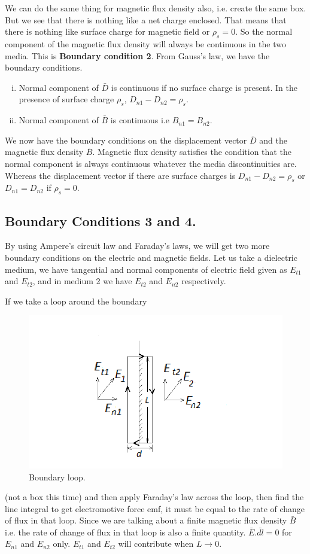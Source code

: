 We can do the same thing for magnetic flux density also, i.e. create the same box. But we see that there is nothing like a net charge enclosed. That means that there is nothing like surface charge for magnetic field or $\rho_s = 0$. So the normal component of the magnetic flux density will always be continuous in the two media. This is \textbf{Boundary condition 2}. From Gauss's law, we have the boundary conditions.
\begin{enumerate}[(i)]
\item Normal component of $\bar{D}$ is continuous if no surface charge is present. In the presence of surface charge $\rho_s$, $D_{n1}- D_{n2} = \rho_s$.
\item Normal component of $\bar{B}$ is continuous i.e $B_{n1} = B_{n2}$.
\end{enumerate}

We now have the boundary conditions on the displacement vector $\bar{D}$ and the magnetic flux density $\bar{B}$. Magnetic flux density satisfies the condition that the normal component is always continuous whatever the media discontinuities are. Whereas the displacement vector if there are surface charges  is $D_{n1}- D_{n2} = \rho_s$ or $D_{n1} = D_{n2} $ if $\rho_s = 0$. 
\subsection{Boundary Conditions 3 and 4.}
By using Ampere's circuit law and Faraday's laws, we will get two more boundary conditions on the electric and magnetic fields. Let us take a dielectric medium, we have tangential and normal components of electric field given as $E_{t1}$ and $E_{t2}$, and in medium 2 we have $E_{t2}$ and $E_{n2}$ respectively.

If we take a loop around the boundary
\begin{figure}[h]
\centering
\includegraphics[width=1\linewidth]{graphics/diemedium4}
\caption{Boundary loop.}
\end{figure}
(not a box this time) and then apply Faraday's law across the loop, then find the line integral to get electromotive force emf, it must be equal to the rate of change of flux in that loop. Since we are talking about a finite magnetic flux density $\bar{B}$ i.e. the rate of change of flux in that loop is also a finite quantity. $\bar{E}.\bar{dl} = 0$ for $E_{n1}$ and $E_{n2}$ only. $E_{t1}$ and $E_{t2}$ will contribute when $L \longrightarrow 0$. 

